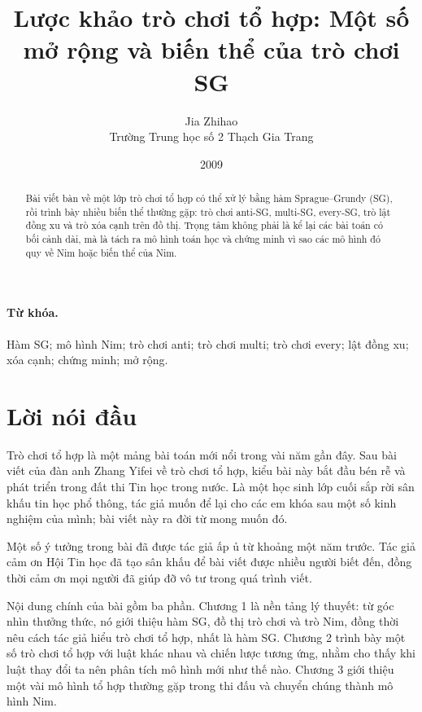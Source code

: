 \documentclass[11pt]{article}
\title{Lược khảo trò chơi tổ hợp: Một số mở rộng và biến thể của trò chơi SG}
\author{Jia Zhihao\\Trường Trung học số 2 Thạch Gia Trang}
\date{2009}
\begin{document}
\maketitle


\begin{abstract}
Bài viết bàn về một lớp trò chơi tổ hợp có thể xử lý bằng hàm Sprague--Grundy
(SG), rồi trình bày nhiều biến thể thường gặp: trò chơi anti-SG, multi-SG,
every-SG, trò lật đồng xu và trò xóa cạnh trên đồ thị. Trọng tâm không phải
là kể lại các bài toán có bối cảnh dài, mà là tách ra mô hình toán học và
chứng minh vì sao các mô hình đó quy về Nim hoặc biến thể của Nim.
\end{abstract}

\paragraph{Từ khóa.}
Hàm SG; mô hình Nim; trò chơi anti; trò chơi multi; trò chơi every; lật đồng
xu; xóa cạnh; chứng minh; mở rộng.

\tableofcontents

\section*{Lời nói đầu}

Trò chơi tổ hợp là một mảng bài toán mới nổi trong vài năm gần đây. Sau bài
viết của đàn anh Zhang Yifei về trò chơi tổ hợp, kiểu bài này bắt đầu bén rễ
và phát triển trong đất thi Tin học trong nước. Là một học sinh lớp cuối sắp
rời sân khấu tin học phổ thông, tác giả muốn để lại cho các em khóa sau một
số kinh nghiệm của mình; bài viết này ra đời từ mong muốn đó.

Một số ý tưởng trong bài đã được tác giả ấp ủ từ khoảng một năm trước. Tác
giả cảm ơn Hội Tin học đã tạo sân khấu để bài viết được nhiều người biết đến,
đồng thời cảm ơn mọi người đã giúp đỡ vô tư trong quá trình viết.

Nội dung chính của bài gồm ba phần. Chương 1 là nền tảng lý thuyết: từ góc
nhìn thưởng thức, nó giới thiệu hàm SG, đồ thị trò chơi và trò Nim, đồng thời
nêu cách tác giả hiểu trò chơi tổ hợp, nhất là hàm SG. Chương 2 trình bày một
số trò chơi tổ hợp với luật khác nhau và chiến lược tương ứng, nhằm cho thấy
khi luật thay đổi ta nên phân tích mô hình mới như thế nào. Chương 3 giới
thiệu một vài mô hình tổ hợp thường gặp trong thi đấu và chuyển chúng thành
mô hình Nim.
\end{document}
